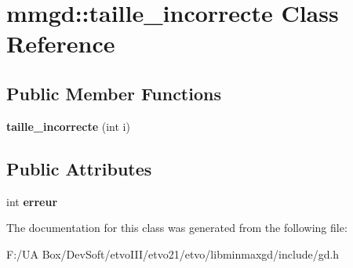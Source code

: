 \section{mmgd\+:\+:taille\+\_\+incorrecte Class Reference}
\label{classmmgd_1_1taille__incorrecte}
\subsection*{Public Member Functions}
\begin{DoxyCompactItemize}
\item 
\mbox{\label{classmmgd_1_1taille__incorrecte_a386ba698f1fbf5c24a7d5dae2bd82cf9}} 
{\bfseries taille\+\_\+incorrecte} (int i)
\end{DoxyCompactItemize}
\subsection*{Public Attributes}
\begin{DoxyCompactItemize}
\item 
\mbox{\label{classmmgd_1_1taille__incorrecte_a7e7428f326edd8e504a84cd90ff931eb}} 
int {\bfseries erreur}
\end{DoxyCompactItemize}


The documentation for this class was generated from the following file\+:\begin{DoxyCompactItemize}
\item 
F\+:/\+U\+A Box/\+Dev\+Soft/etvo\+I\+I\+I/etvo21/etvo/libminmaxgd/include/gd.\+h\end{DoxyCompactItemize}
